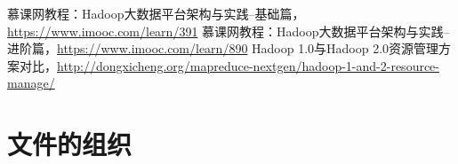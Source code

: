\documentclass[forprint]{myreport}
\begin{document}
\cleardoublepage{}
{}




\begin{thebibliography}{00}
   慕课网教程：Hadoop大数据平台架构与实践--基础篇，\url{https://www.imooc.com/learn/391}
   慕课网教程：Hadoop大数据平台架构与实践--进阶篇，\url{https://www.imooc.com/learn/890}
   Hadoop 1.0与Hadoop 2.0资源管理方案对比，\url{http://dongxicheng.org/mapreduce-nextgen/hadoop-1-and-2-resource-manage/}

\end{thebibliography}
\appendix

\chapter{文件的组织}

\cleardoublepage
\end{document}

